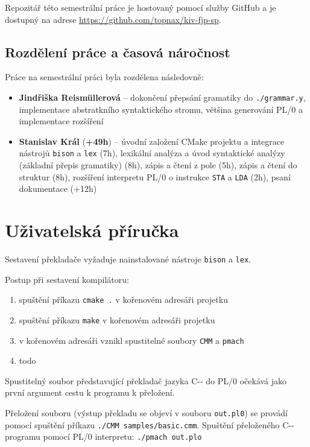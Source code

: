 \documentclass[12pt, a4paper]{article}
\let\oldsection\section
\renewcommand\section{\clearpage\oldsection}
\begin{document}
Repozitář této semestrální práce je hostovaný pomocí služby GitHub a je dostupný na adrese \url{https://github.com/topnax/kiv-fjp-sp}.


\subsection{Rozdělení práce a časová náročnost}
Práce na semestrální práci byla rozdělena následovně:
\begin{itemize}
    \item \textbf{Jindřiška Reismüllerová} -- dokončení přepsání gramatiky do \texttt{./grammar.y}, implementace abstratkního syntaktického stromu, většina generování PL/0 a implementace rozšíření
    \item \textbf{Stanislav Král} (\textbf{+49h}) -- úvodní založení CMake projektu a integrace nástrojů \texttt{bison} a \texttt{lex} (7h), lexikální analýza a úvod syntaktické analýzy (základní přepis gramatiky) (8h), zápis a čtení z pole (5h), zápis a čtení do struktur (8h), rozšíření interpretu PL/0 o instrukce \texttt{STA} a \texttt{LDA} (2h), psaní dokumentace (+12h)
\end{itemize}


\section{Uživatelská příručka}
Sestavení překladače vyžaduje nainstalované nástroje \texttt{bison} a \texttt{lex}.

\newline
\noindent Postup při sestavení kompilátoru:
\begin{enumerate}
    \item spuštění příkazu \texttt{cmake .} v kořenovém adresáři projetku
    \item spuštění příkazu \texttt{make} v kořenovém adresáři projetku
    \item v kořenovém adresáři vznikl spustitelné soubory \texttt{CMM} a \texttt{pmach}
    \item \LARGE todo
\end{enumerate}

Spustitelný soubor představující překladač jazyka C-{}- do PL/0 očekává jako první argument cestu k programu k přeložení.

\newline
Přeložení souboru (výstup překladu se objeví v souboru \texttt{out.pl0}) se provádí pomocí spuštění příkazu \texttt{./CMM samples/basic.cmm}. Spuštění přeloženého C-{}- programu pomocí PL/0 interpretu: \texttt{./pmach out.plo}

    
\end{document}
